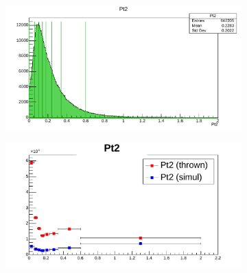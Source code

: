 \begin{figure}[hbtp]
        \begin{subfigure}{.5\textwidth}
            \centering
            \includegraphics[width=\linewidth]{13dataanalysis/img/40_accbins_pt2.pdf}
            \label{fig::acc_corr_bins_pt2}
        \end{subfigure}
        \begin{subfigure}{.5\textwidth}
            \centering
            \includegraphics[width=\linewidth]{13dataanalysis/img/40_acccorr_pt2.pdf}
            \label{fig::acc_corr_pt2}
        \end{subfigure}


\end{figure}
